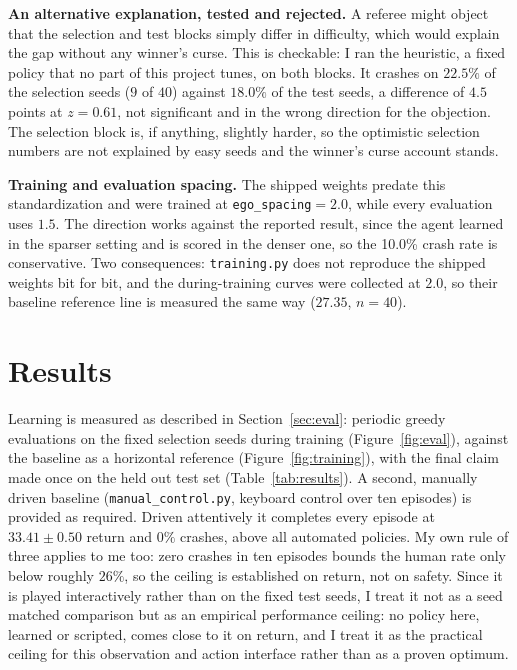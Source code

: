 \documentclass{article}
\newcommand{\agentcrash}{10.0}
\begin{document}
\textbf{An alternative explanation, tested and rejected.} A referee might object that the selection and test blocks simply differ in difficulty, which would explain the gap without any winner's curse. This is checkable: I ran the heuristic, a fixed policy that no part of this project tunes, on both blocks. It crashes on $22.5\%$ of the selection seeds ($9$ of $40$) against $18.0\%$ of the test seeds, a difference of $4.5$ points at $z{=}0.61$, not significant and in the wrong direction for the objection. The selection block is, if anything, slightly harder, so the optimistic selection numbers are not explained by easy seeds and the winner's curse account stands.


\textbf{Training and evaluation spacing.} The shipped weights predate this standardization and were trained at \texttt{ego\_spacing}${=}2.0$, while every evaluation uses $1.5$. The direction works against the reported result, since the agent learned in the sparser setting and is scored in the denser one, so the \agentcrash\% crash rate is conservative. Two consequences: \texttt{training.py} does not reproduce the shipped weights bit for bit, and the during-training curves were collected at $2.0$, so their baseline reference line is measured the same way ($27.35$, $n{=}40$).

\section{Results}
\label{sec:results}


Learning is measured as described in Section~\ref{sec:eval}: periodic greedy evaluations on the fixed selection seeds during training (Figure~\ref{fig:eval}), against the baseline as a horizontal reference (Figure~\ref{fig:training}), with the final claim made once on the held out test set (Table~\ref{tab:results}). A second, manually driven baseline (\texttt{manual\_control.py}, keyboard control over ten episodes) is provided as required. Driven attentively it completes every episode at $33.41\pm0.50$ return and $0\%$ crashes, above all automated policies. My own rule of three applies to me too: zero crashes in ten episodes bounds the human rate only below roughly $26\%$, so the ceiling is established on return, not on safety. Since it is played interactively rather than on the fixed test seeds, I treat it not as a seed matched comparison but as an empirical performance ceiling: no policy here, learned or scripted, comes close to it on return, and I treat it as the practical ceiling for this observation and action interface rather than as a proven optimum.
\end{document}
